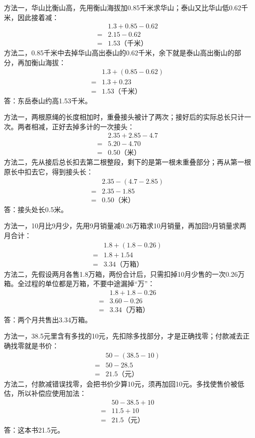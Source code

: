 \documentclass[multi=snippet,border=0pt]{standalone}
\newenvironment{snippet}[3]{\begin{minipage}{#1bp}\color{answerred}\fontsize{#2}{#3}\selectfont\raggedright}{\end{minipage}}
\begin{document}
\begin{snippet}{505}{11.5}{14}方法一，华山比衡山高，先用衡山海拔加0.85千米求华山；泰山又比华山低0.62千米，因此接着减：\[\begin{aligned}&1.3+0.85-0.62\\={}&2.15-0.62\\={}&1.53\text{（千米）}\end{aligned}\]方法二，0.85千米中去掉华山高出泰山的0.62千米，余下就是泰山高出衡山的部分，再加衡山海拔：\[\begin{aligned}&1.3+(0.85-0.62)\\={}&1.3+0.23\\={}&1.53\text{（千米）}\end{aligned}\]答：东岳泰山约高1.53千米。\end{snippet}
\begin{snippet}{505}{11.5}{14}方法一，两根原绳的长度相加时，重叠接头被计了两次；接好后的实际总长只计一次。两者相减，正好去掉多计的一次接头：\[\begin{aligned}&2.35+2.85-4.7\\={}&5.20-4.70\\={}&0.50\text{（米）}\end{aligned}\]方法二，先从接后总长扣去第二根整段，剩下的是第一根未重叠部分；再从第一根原长中扣去它，得到接头长：\[\begin{aligned}&2.35-(4.7-2.85)\\={}&2.35-1.85\\={}&0.50\text{（米）}\end{aligned}\]答：接头处长0.5米。\end{snippet}
\begin{snippet}{505}{11.5}{14}方法一，10月比9月少，先用9月销量减0.26万箱求10月销量，再加回9月销量求两月合计：\[\begin{aligned}&1.8+(1.8-0.26)\\={}&1.8+1.54\\={}&3.34\text{（万箱）}\end{aligned}\]方法二，先假设两月各售1.8万箱，两份合计后，只需扣掉10月少售的一次0.26万箱。全过程的单位都是万箱，不要中途漏掉“万”：\[\begin{aligned}&1.8+1.8-0.26\\={}&3.60-0.26\\={}&3.34\text{（万箱）}\end{aligned}\]答：两个月共售出3.34万箱。\end{snippet}
\begin{snippet}{505}{11.5}{14}方法一，38.5元里含有多找的10元，先扣除多找部分，才是正确找零；付款减去正确找零就是书价：\[\begin{aligned}&50-(38.5-10)\\={}&50-28.5\\={}&21.5\text{（元）}\end{aligned}\]方法二，付款减错误找零，会把书价少算10元，须再加回10元。多找使售价被低估，所以补偿应使用加法：\[\begin{aligned}&50-38.5+10\\={}&11.5+10\\={}&21.5\text{（元）}\end{aligned}\]答：这本书21.5元。\end{snippet}
\end{document}
